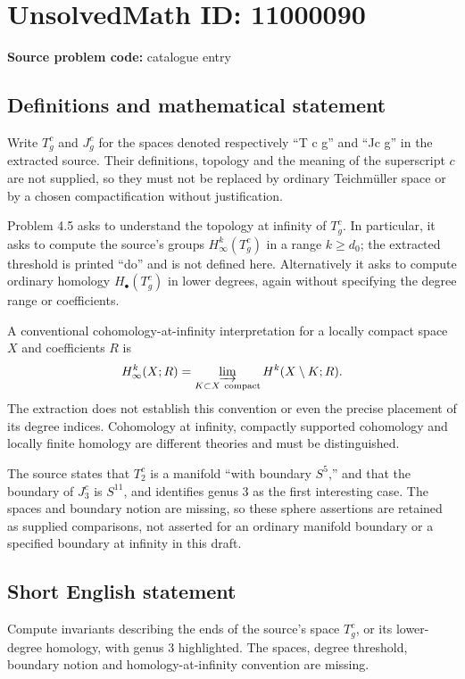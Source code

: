 \documentclass[11pt]{article}
\begin{document}
\section*{UnsolvedMath ID: 11000090}
\textbf{Source problem code:} catalogue entry
\subsection{Definitions and mathematical statement}
Write $T_g^c$ and $J_g^c$ for the spaces denoted respectively ``T c g'' and ``Jc g'' in the extracted source. Their definitions, topology and the meaning of the superscript $c$ are not supplied, so they must not be replaced by ordinary Teichm\"uller space or by a chosen compactification without justification.

Problem 4.5 asks to understand the topology at infinity of $T_g^c$. In particular, it asks to compute the source's groups $H^k_\infty(T_g^c)$ in a range $k\geq d_0$; the extracted threshold is printed ``do'' and is not defined here. Alternatively it asks to compute ordinary homology $H_\bullet(T_g^c)$ in lower degrees, again without specifying the degree range or coefficients.

A conventional cohomology-at-infinity interpretation for a locally compact space $X$ and coefficients $R$ is
\[
 H^k_\infty(X;R)=\varinjlim_{K\subset X\ \mathrm{compact}}H^k(X\setminus K;R).
\]
The extraction does not establish this convention or even the precise placement of its degree indices. Cohomology at infinity, compactly supported cohomology and locally finite homology are different theories and must be distinguished.

The source states that $T_2^c$ is a manifold ``with boundary $S^5$,'' and that the boundary of $J_3^c$ is $S^{11}$, and identifies genus $3$ as the first interesting case. The spaces and boundary notion are missing, so these sphere assertions are retained as supplied comparisons, not asserted for an ordinary manifold boundary or a specified boundary at infinity in this draft.
\subsection{Short English statement}
Compute invariants describing the ends of the source's space $T_g^c$, or its lower-degree homology, with genus $3$ highlighted. The spaces, degree threshold, boundary notion and homology-at-infinity convention are missing.
\end{document}
